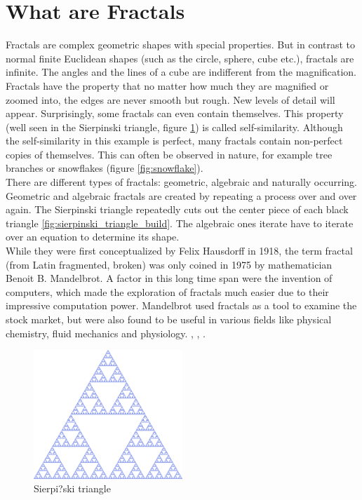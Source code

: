 \documentclass[10pt,a4paper,titlepage]{article}
\begin{document}
	\section{What are Fractals}
	Fractals are complex geometric shapes with special properties. But in contrast to normal finite Euclidean shapes (such as the circle, sphere, cube etc.), fractals are infinite. The angles and the lines of a cube are indifferent from the magnification. Fractals have the property that no matter how much they are magnified or zoomed into, the edges are never smooth but rough. New levels of detail will appear. Surprisingly, some fractals can even contain themselves. This property (well seen in the Sierpinski triangle, figure \ref{fig:sierpinski_triangle}) is called self-similarity. Although the self-similarity in this example is perfect, many fractals contain non-perfect copies of themselves. This can often be observed in nature, for example tree branches or snowflakes (figure \ref{fig:snowflake}).\\
	There are different types of fractals: geometric, algebraic and naturally occurring. Geometric and algebraic fractals are created by repeating a process over and over again. The Sierpinski triangle repeatedly cuts out the center piece of each black triangle \ref{fig:sierpinski_triangle_build}. The algebraic ones iterate have to iterate over an equation to determine its shape.\\
	While they were first conceptualized by Felix Hausdorff in 1918, the term fractal (from Latin fragmented, broken) was only coined in 1975 by mathematician Benoit B. Mandelbrot. A factor in this long time span were the invention of computers, which made the exploration of fractals much easier due to their impressive computation power. Mandelbrot used fractals as a tool to examine the stock market, but were also found to be useful in various fields like physical chemistry, fluid mechanics and physiology. \cite{FractalFoundation}, \cite{FractalFoundation}, \cite{britannica}.
	\begin{figure}[h]
		\caption{Sierpi?ski triangle \cite{Sierpinski}}
		\label{fig:sierpinski_triangle}
		\centering
		\includegraphics[width=0.5\textwidth]{"res/images/1000px-Sierpinski_triangle.svg.png"}
	\end{figure}
\end{document}
